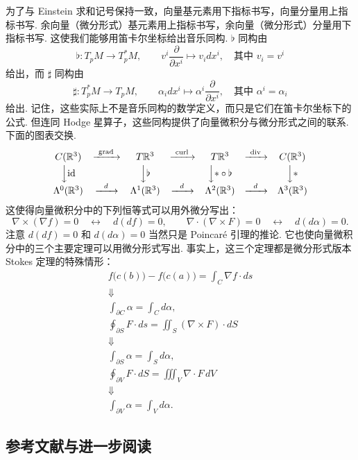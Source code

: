 为了与 Einstein 求和记号保持一致，向量基元素用下指标书写，向量分量用上指标书写. 余向量（微分形式）基元素用上指标书写，余向量（微分形式）分量用下指标书写. 这使我们能够用笛卡尔坐标给出音乐同构. $\flat$ 同构由
\[
\flat:T_pM\longrightarrow T_p^*M,\qquad v^i\frac{\partial}{\partial x^i}\longmapsto v_idx^i,\quad\text{其中 }v_i=v^i
\]
给出，而 $\sharp$ 同构由
\[
\sharp:T_p^*M\longrightarrow T_pM,\qquad \alpha_idx^i\longmapsto\alpha^i\frac{\partial}{\partial x^i},\quad\text{其中 }\alpha^i=\alpha_i
\]
给出. 记住，这些实际上不是音乐同构的数学定义，而只是它们在笛卡尔坐标下的公式. 但连同 Hodge 星算子，这些同构提供了向量微积分与微分形式之间的联系. 下面的图表交换.
\[
\begin{array}{ccccccccc}
C(\mathbb{R}^3)&\xrightarrow{\ \operatorname{grad}\ }&T\mathbb{R}^3&\xrightarrow{\ \operatorname{curl}\ }&T\mathbb{R}^3&\xrightarrow{\ \operatorname{div}\ }&C(\mathbb{R}^3)\\[2pt]
\Big\downarrow \mathrm{id}&&\Big\downarrow \flat&&\Big\downarrow {\ast\circ\flat}&&\Big\downarrow \ast\\[2pt]
\Lambda^0(\mathbb{R}^3)&\xrightarrow{\ \ d\ \ }&\Lambda^1(\mathbb{R}^3)&\xrightarrow{\ \ d\ \ }&\Lambda^2(\mathbb{R}^3)&\xrightarrow{\ \ d\ \ }&\Lambda^3(\mathbb{R}^3)
\end{array}
\]
这使得向量微积分中的下列恒等式可以用外微分写出：
\[
\nabla\times(\nabla f)=0\quad\longleftrightarrow\quad d(df)=0,\qquad
\nabla\cdot(\nabla\times F)=0\quad\longleftrightarrow\quad d(d\alpha)=0.
\]
注意 $d(df)=0$ 和 $d(d\alpha)=0$ 当然只是 Poincaré 引理的推论. 它也使向量微积分中的三个主要定理可以用微分形式写出. 事实上，这三个定理都是微分形式版本 Stokes 定理的特殊情形：
\begin{align*}
f\bigl(c(b)\bigr)-f\bigl(c(a)\bigr)=\int_C\nabla f\cdot ds \\
\Downarrow \\
\int_{\partial C}\alpha=\int_C d\alpha, \\
\oint_{\partial S}F\cdot ds=\iint_S(\nabla\times F)\cdot dS \\
\Downarrow \\
\int_{\partial S}\alpha=\int_S d\alpha, \\
\oint_{\partial V}F\cdot dS=\iiint_V\nabla\cdot F\,dV \\
\Downarrow \\
\int_{\partial V}\alpha=\int_V d\alpha.
\end{align*}

\subsection{参考文献与进一步阅读}

